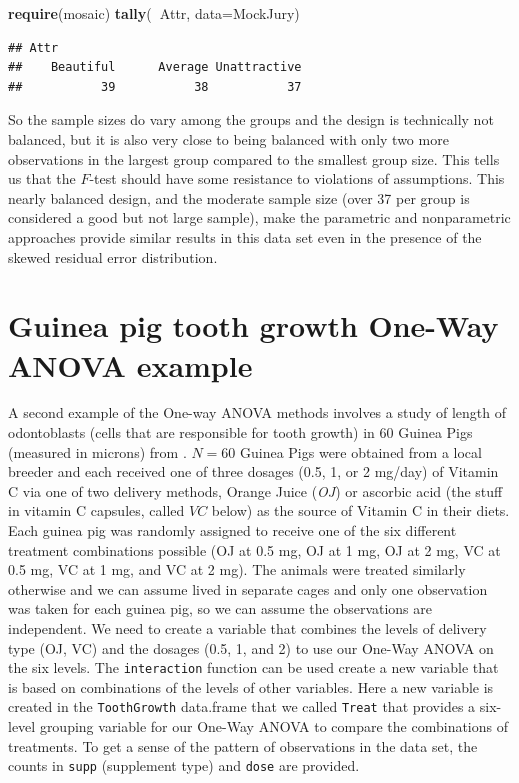 \documentclass[]{book}
\newenvironment{Shaded}{\begin{snugshade}}{\end{snugshade}}
\newcommand{\KeywordTok}[1]{\textcolor[rgb]{0.13,0.29,0.53}{\textbf{#1}}}
\newcommand{\DataTypeTok}[1]{\textcolor[rgb]{0.13,0.29,0.53}{#1}}
\newcommand{\OperatorTok}[1]{\textcolor[rgb]{0.81,0.36,0.00}{\textbf{#1}}}
\newcommand{\NormalTok}[1]{#1}
\theoremstyle{definition}
\theoremstyle{definition}
\theoremstyle{remark}
\begin{document}
\begin{Shaded}
\begin{Highlighting}[]
\KeywordTok{require}\NormalTok{(mosaic)}
\KeywordTok{tally}\NormalTok{(}\OperatorTok{~}\NormalTok{Attr, }\DataTypeTok{data=}\NormalTok{MockJury)}
\end{Highlighting}
\end{Shaded}

\begin{verbatim}
## Attr
##    Beautiful      Average Unattractive 
##           39           38           37
\end{verbatim}

So the sample sizes do vary among the groups and the design is
technically not balanced, but it is also very close to being balanced
with only two more observations in the largest group compared to the
smallest group size. This tells us that the \(F\)-test should have some
resistance to violations of assumptions. This nearly balanced design,
and the moderate sample size (over 37 per group is considered a good but
not large sample), make the parametric and nonparametric approaches
provide similar results in this data set even in the presence of the
skewed residual error distribution.

\section{Guinea pig tooth growth One-Way ANOVA
example}\label{section3-5}

A second example of the One-way ANOVA methods involves a study of length
of odontoblasts (cells that are responsible for tooth growth) in 60
Guinea Pigs (measured in microns) from \citet{Crampton1947}. \(N=60\)
Guinea Pigs were obtained from a local breeder and each received one of
three dosages (0.5, 1, or 2 mg/day) of Vitamin C via one of two delivery
methods, Orange Juice (\emph{OJ}) or ascorbic acid (the stuff in vitamin
C capsules, called \(VC\) below) as the source of Vitamin C in their
diets. Each guinea pig was randomly assigned to receive one of the six
different treatment combinations possible (OJ at 0.5 mg, OJ at 1 mg, OJ
at 2 mg, VC at 0.5 mg, VC at 1 mg, and VC at 2 mg). The animals were
treated similarly otherwise and we can assume lived in separate cages
and only one observation was taken for each guinea pig, so we can assume
the observations are independent. We need to create a variable that
combines the levels of delivery type (OJ, VC) and the dosages (0.5, 1,
and 2) to use our One-Way ANOVA on the six levels. The
\texttt{interaction} function can be used create a new variable that is
based on combinations of the levels of other variables. Here a new
variable is created in the \texttt{ToothGrowth} data.frame that we
called \texttt{Treat} that provides a six-level grouping variable for
our One-Way ANOVA to compare the combinations of treatments. To get a
sense of the pattern of observations in the data set, the counts in
\texttt{supp} (supplement type) and \texttt{dose} are provided.
\end{document}
